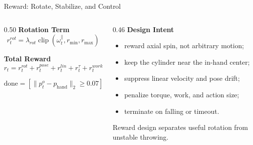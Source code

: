 \documentclass{beamer}
\begin{document}
\begin{frame}{Reward: Rotate, Stabilize, and Control}
    \footnotesize
    \vspace{0.7em}
    \begin{columns}[T,onlytextwidth]
        \begin{column}{0.50\textwidth}
            \textbf{\textcolor{maincolor}{Rotation Term}}
            \[
                r_t^{rot}
                =
                \lambda_{rot}
                \operatorname{clip}
                \left(
                    \omega_t^{\parallel},
                    r_{\min}, r_{\max}
                \right)
            \]

            \vspace{0.3em}
            \textbf{\textcolor{maincolor}{Total Reward}}
            \[
                r_t =
                r_t^{rot}
                + r_t^{pose}
                + r_t^{lin}
                + r_t^\tau
                + r_t^{work}
                + r_t^a
                + r_t^{center}
            \]

            \[
                \mathrm{done}
                =
                [\|p_t^o-p_{\mathrm{hand}}\|_2\ge0.07]
                \vee[t\ge T]
            \]
        \end{column}
        \begin{column}{0.46\textwidth}
            \textbf{\textcolor{maincolor}{Design Intent}}
            \begin{itemize}
                \item reward axial spin, not arbitrary motion;
                \item keep the cylinder near the in-hand center;
                \item suppress linear velocity and pose drift;
                \item penalize torque, work, and action size;
                \item terminate on falling or timeout.
            \end{itemize}

            \vspace{0.35em}
            \centering
            \textcolor{maincolor}{Reward design separates useful rotation from unstable throwing.}
        \end{column}
    \end{columns}
\end{frame}
\end{document}
